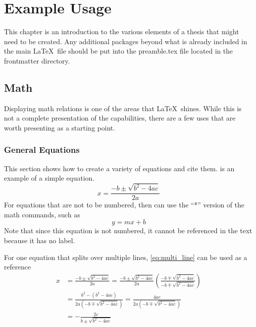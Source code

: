 \chapter{Example Usage} \label{sec:ExampleUsage}
    This chapter is an introduction to the various elements of a thesis that might need to be created.
    Any additional packages beyond what is already included in the main \LaTeX\ file should be put into the preamble.tex file located in the frontmatter directory.

\section{Math} \label{sec:Math}
    Displaying math relations is one of the areas that \LaTeX\ shines.
    While this is not a complete presentation of the capabilities, there are a few uses that are worth presenting as a starting point.

\subsection{General Equations}
    This section shows how to create a variety of equations and cite them.
     is an example of a simple equation.
    \begin{equation} \label{eq:quadratic_formula}
        x=\frac{-b\pm\sqrt{b^2-4ac}}{2a}
    \end{equation}
    For equations that are not to be numbered, then can use the ``*'' version of the math commands, such as
    \begin{equation*}
        y=mx+b
    \end{equation*}
    Note that since this equation is not numbered, it cannot be referenced in the text because it has no label.

    For one equation that splits over multiple lines, \cref{eq:multi_line} can be used as a reference
    \begin{equation} \label{eq:multi_line}
        \begin{split}
            x&=\frac{-b\pm\sqrt{b^2-4ac}}{2a}
              =\frac{-b\pm\sqrt{b^2-4ac}}{2a}\left(\frac{-b\mp\sqrt{b^2-4ac}}{-b\mp\sqrt{b^2-4ac}}\right) \\
             &=\frac{b^2-\left(b^2-4ac\right)}{2a\left(-b\mp\sqrt{b^2-4ac}\right)}
              =\frac{4ac}{2a\left(-b\mp\sqrt{b^2-4ac}\right)} \\
             &=-\frac{2c}{b \pm \sqrt{b^2-4ac}}
        \end{split}
    \end{equation}

